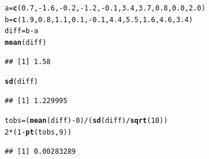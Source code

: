 \documentclass[t,xcolor=pdftex,dvipsnames,table]{beamer}
\makeatletter
\newcommand{\hlnum}[1]{\textcolor[rgb]{0.686,0.059,0.569}{#1}}%
\newcommand{\hlopt}[1]{\textcolor[rgb]{0,0,0}{#1}}%
\newcommand{\hlstd}[1]{\textcolor[rgb]{0.345,0.345,0.345}{#1}}%
\newcommand{\hlkwb}[1]{\textcolor[rgb]{0.69,0.353,0.396}{#1}}%
\newcommand{\hlkwd}[1]{\textcolor[rgb]{0.737,0.353,0.396}{\textbf{#1}}}%
\newenvironment{kframe}{%
 \def\at@end@of@kframe{}%
 \ifinner\ifhmode%
  \def\at@end@of@kframe{\end{minipage}}%
  \begin{minipage}{\columnwidth}%
 \fi\fi%
 \def\FrameCommand##1{\hskip\@totalleftmargin \hskip-\fboxsep
 \colorbox{shadecolor}{##1}\hskip-\fboxsep
     \hskip-\linewidth \hskip-\@totalleftmargin \hskip\columnwidth}%
 \MakeFramed {\advance\hsize-\width
   \@totalleftmargin\z@ \linewidth\hsize
   \@setminipage}}%
 {\par\unskip\endMakeFramed%
 \at@end@of@kframe}
\newenvironment{knitrout}{}{} %
\makeatother
\begin{document}
\begin{frame}[fragile]{}
\begin{knitrout}
\color{fgcolor}\begin{kframe}
\begin{alltt}
\hlstd{a}\hlkwb{=}\hlkwd{c}\hlstd{(}\hlnum{0.7}\hlstd{,}\hlopt{-}\hlnum{1.6}\hlstd{,}\hlopt{-}\hlnum{0.2}\hlstd{,}\hlopt{-}\hlnum{1.2}\hlstd{,}\hlopt{-}\hlnum{0.1}\hlstd{,}\hlnum{3.4}\hlstd{,}\hlnum{3.7}\hlstd{,}\hlnum{0.8}\hlstd{,}\hlnum{0.0}\hlstd{,}\hlnum{2.0}\hlstd{)}
\hlstd{b}\hlkwb{=}\hlkwd{c}\hlstd{(}\hlnum{1.9}\hlstd{,}\hlnum{0.8}\hlstd{,}\hlnum{1.1}\hlstd{,}\hlnum{0.1}\hlstd{,}\hlopt{-}\hlnum{0.1}\hlstd{,}\hlnum{4.4}\hlstd{,}\hlnum{5.5}\hlstd{,}\hlnum{1.6}\hlstd{,}\hlnum{4.6}\hlstd{,}\hlnum{3.4}\hlstd{)}
\hlstd{diff}\hlkwb{=}\hlstd{b}\hlopt{-}\hlstd{a}
\hlkwd{mean}\hlstd{(diff)}
\end{alltt}
\begin{verbatim}
## [1] 1.58
\end{verbatim}
\begin{alltt}
\hlkwd{sd}\hlstd{(diff)}
\end{alltt}
\begin{verbatim}
## [1] 1.229995
\end{verbatim}
\begin{alltt}
\hlstd{tobs} \hlkwb{=} \hlstd{(}\hlkwd{mean}\hlstd{(diff)}\hlopt{-}\hlnum{0}\hlstd{)}\hlopt{/}\hlstd{(}\hlkwd{sd}\hlstd{(diff)}\hlopt{/}\hlkwd{sqrt}\hlstd{(}\hlnum{10}\hlstd{))}
\hlnum{2}\hlopt{*}\hlstd{(}\hlnum{1}\hlopt{-}\hlkwd{pt}\hlstd{(tobs,}\hlnum{9}\hlstd{))}
\end{alltt}
\begin{verbatim}
## [1] 0.00283289
\end{verbatim}
\end{kframe}
\end{knitrout}
\end{frame}
\end{document}
